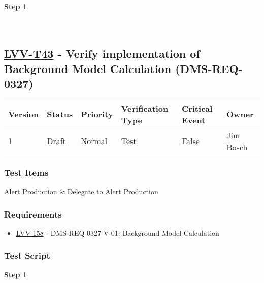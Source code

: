 \textbf{Step 1}\\
~\\
~\\

\hypertarget{lvv-t43---verify-implementation-of-background-model-calculation-dms-req-0327}{%
\subsection{\texorpdfstring{\href{https://jira.lsstcorp.org/secure/Tests.jspa\#/testCase/LVV-T43}{LVV-T43}
- Verify implementation of Background Model Calculation
(DMS-REQ-0327)}{LVV-T43 - Verify implementation of Background Model Calculation (DMS-REQ-0327)}}\label{lvv-t43---verify-implementation-of-background-model-calculation-dms-req-0327}}

\begin{longtable}[]{@{}llllll@{}}
\toprule
Version & Status & Priority & Verification Type & Critical Event &
Owner\tabularnewline
\midrule
\endhead
1 & Draft & Normal & Test & False & Jim Bosch\tabularnewline
\bottomrule
\end{longtable}

\hypertarget{test-items-132}{%
\subsubsection{Test Items}\label{test-items-132}}

Alert Production \& Delegate to Alert Production

\hypertarget{requirements-133}{%
\subsubsection{Requirements}\label{requirements-133}}

\begin{itemize}
\tightlist
\item
  \href{https://jira.lsstcorp.org/browse/LVV-158}{LVV-158} -
  DMS-REQ-0327-V-01: Background Model Calculation
\end{itemize}

\hypertarget{test-script-133}{%
\subsubsection{Test Script}\label{test-script-133}}

\textbf{Step 1}\\
~\\
~\\

